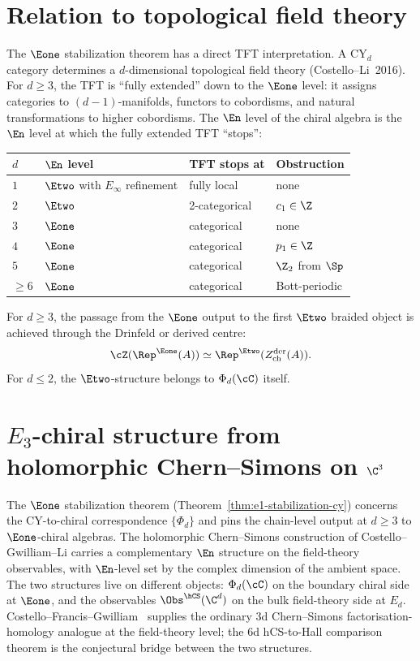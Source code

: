 \section{Relation to topological field theory}
\label{sec:en-tft}

The $\Eone$ stabilization theorem has a direct TFT interpretation. A CY$_d$ category determines a $d$-dimensional topological field theory (Costello--Li~2016). For $d \geq 3$, the TFT is ``fully extended'' down to the $\Eone$ level: it assigns categories to $(d-1)$-manifolds, functors to cobordisms, and natural transformations to higher cobordisms. The $\En$ level of the chiral algebra is the $\En$ level at which the fully extended TFT ``stops'':

\begin{center}
\renewcommand{\arraystretch}{1.3}
\begin{tabular}{llll}
 \toprule
 $d$ & $\En$ level & TFT stops at & Obstruction \\
 \midrule
 $1$ & $\Etwo$ with $E_\infty$ refinement & fully local & none \\
 $2$ & $\Etwo$ & 2-categorical & $c_1 \in \Z$ \\
 $3$ & $\Eone$ & categorical & none \\
 $4$ & $\Eone$ & categorical & $p_1 \in \Z$ \\
 $5$ & $\Eone$ & categorical & $\Z_2$ from $\Sp$ \\
 $\geq 6$ & $\Eone$ & categorical & Bott-periodic \\
 \bottomrule
\end{tabular}
\end{center}

For $d\geq3$, the passage from the $\Eone$ output to the first $\Etwo$ braided object is achieved through the Drinfeld or derived centre:
\[
 \cZ(\Rep^{\Eone}(A)) \simeq
 \Rep^{\Etwo}(Z^{\mathrm{der}}_{\mathrm{ch}}(A)).
\]
For $d\leq2$, the \(\Etwo\)-structure belongs to \(\Phi_d(\cC)\) itself.

\section{\texorpdfstring{$E_3$}{E-3}-chiral structure from holomorphic Chern--Simons on \texorpdfstring{$\C^3$}{C-3}}
\label{sec:e3-from-hcs}

The $\Eone$ stabilization theorem
(Theorem~\ref{thm:e1-stabilization-cy}) concerns the CY-to-chiral
correspondence $\{\Phi_d\}$ and pins the chain-level output
at $d \geq 3$ to $\Eone$-chiral algebras. The holomorphic
Chern--Simons construction of Costello--Gwilliam--Li carries a
complementary $\En$ structure on the field-theory observables, with
$\En$-level set by the complex dimension of the ambient space. The
two structures live on different objects: $\Phi_d(\cC)$ on the
boundary chiral side at $\Eone$, and the observables
$\Obs^{\hCS}(\C^d)$ on the bulk field-theory side at $E_d$.
Costello--Francis--Gwilliam~\cite{CFG2026} supplies the ordinary $3$d
Chern--Simons factorisation-homology analogue at the field-theory
level; the $6$d hCS-to-Hall comparison theorem is the conjectural
bridge between the two structures.

